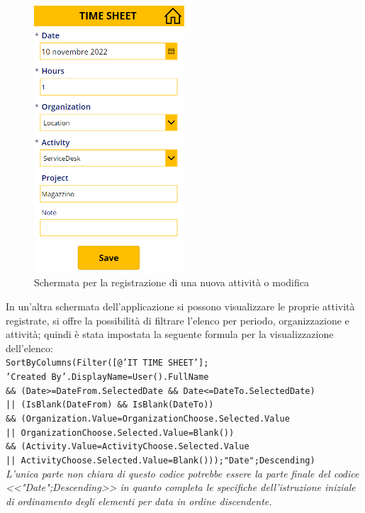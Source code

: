 \begin{figure}[H]
  \centering\includegraphics[width=0.5\textwidth, height=0.5\textheight,keepaspectratio]{immagini/IT-new.png}
  \caption{Schermata per la registrazione di una nuova attività o modifica}
  \label{fig:IT-New}
\end{figure}
In un'altra schermata dell'applicazione si possono visualizzare le proprie attività registrate, si offre la possibilità di filtrare l'elenco per periodo, organizzazione e attività; quindi è stata impostata la seguente formula per la visualizzazione dell'elenco:\\
\texttt{SortByColumns(Filter([@'IT TIME SHEET'];\\'Created By'.DisplayName=User().FullName \\
\&\& (Date>=DateFrom.SelectedDate \&\& Date<=DateTo.SelectedDate)\\|| (IsBlank(DateFrom) \&\& IsBlank(DateTo))\\
\&\& (Organization.Value=OrganizationChoose.Selected.Value\\|| OrganizationChoose.Selected.Value=Blank())\\ 
\&\& (Activity.Value=ActivityChoose.Selected.Value\\|| ActivityChoose.Selected.Value=Blank()));"Date";Descending)}\\
\textit{L'unica parte non chiara di questo codice potrebbe essere la parte finale del codice <<"Date";Descending>> in quanto completa le specifiche dell'istruzione iniziale di ordinamento degli elementi per data in ordine discendente.}\\
